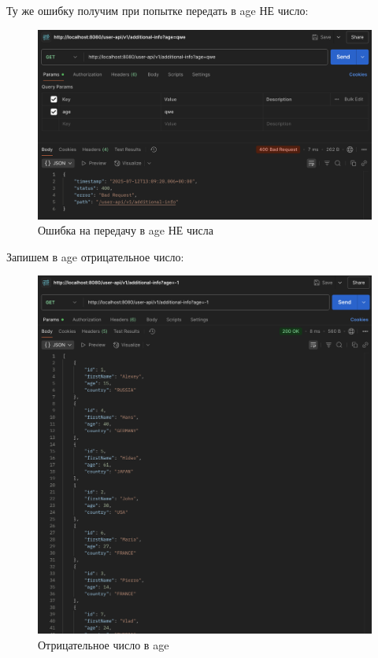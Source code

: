 \documentclass[a4paper, 14pt]{article}
\begin{document}
Ту же ошибку получим при попытке передать в age НЕ число:

\begin{figure}[H]
	\centering
	\includegraphics[width=15cm]{resources/10.png}
	\caption{Ошибка на передачу в age НЕ числа}
\end{figure}

Запишем в age отрицательное число:

\begin{figure}[H]
	\centering
	\includegraphics[width=15cm]{resources/11.png}
	\caption{Отрицательное число в age}
\end{figure}
\end{document}
